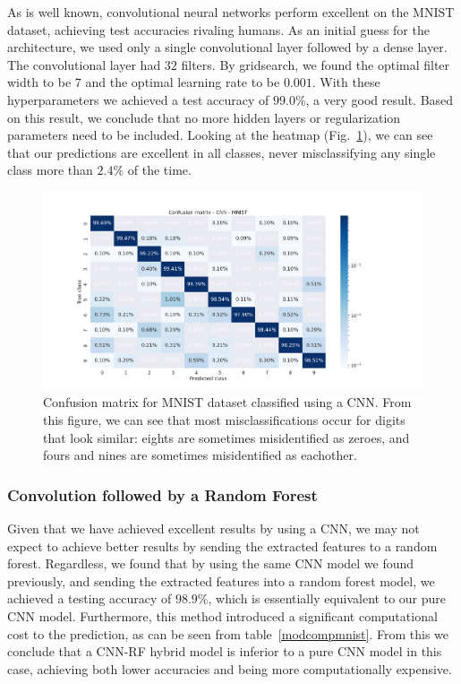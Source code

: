 \documentclass[onecolumn,10pt,cleanfoot]{asme2ej}
\begin{document}
As is well known, convolutional neural networks perform excellent on the MNIST dataset, achieving test accuracies rivaling humans. As an initial guess for the architecture, we used only a single convolutional layer followed by a dense layer. The convolutional layer had $32$ filters. By gridsearch, we found the optimal filter width to be $7$ and the optimal learning rate to be $0.001$. With these hyperparameters we achieved a test accuracy of $99.0\%$, a very good result. Based on this result, we conclude that no more hidden layers or regularization parameters need to be included. Looking at the heatmap (Fig.~\ref{mnistheatmap_cnn}), we can see that our predictions are excellent in all classes, never misclassifying any single class more than $2.4\%$ of the time.

\begin{figure}[H]
\centerline{\includegraphics[width=8in]{figure/conf_cnn_MNIST.png}}
\caption{Confusion matrix for MNIST dataset classified using a CNN. From this figure, we can see that most misclassifications occur for digits that look similar: eights are sometimes misidentified as zeroes, and fours and nines are sometimes misidentified as eachother.}
\label{mnistheatmap_cnn}
\end{figure}

\subsubsection{Convolution followed by a Random Forest}

Given that we have achieved excellent results by using a CNN, we may not expect to achieve better results by sending the extracted features to a random forest. Regardless, we found that by using the same CNN model we found previously, and sending the extracted features into a random forest model, we achieved a testing accuracy of $98.9\%$, which is essentially equivalent to our pure CNN model. Furthermore, this method introduced a significant computational cost to the prediction, as can be seen from table~\ref{modcompmnist}. From this we conclude that a CNN-RF hybrid model is inferior to a pure CNN model in this case, achieving both lower accuracies and being more computationally expensive.
\end{document}
